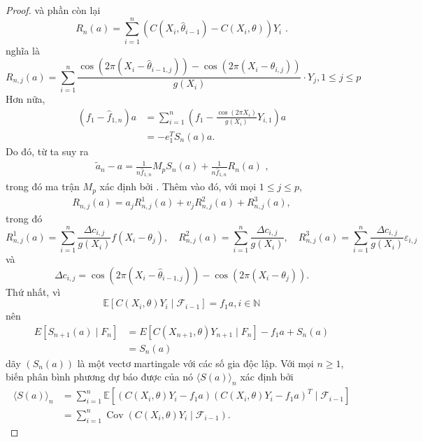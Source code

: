 \begin{proof}
và phần còn lại
$$
R_{n}(a)=\sum_{i=1}^{n}\left(C\left(X_{i}, \widehat{\theta}_{i-1}\right)-C\left(X_{i}, \theta\right)\right) Y_{i} \text{ .}
$$
nghĩa là 
$$
R_{n,j}(a) = \sum_{i=1}^n \frac{\cos \left(2 \pi\left(X_i-\hat{\theta}_{i-1,j}\right)\right)-\cos \left(2 \pi\left(X_i-\theta_{i, j}\right)\right)}{g\left(X_i\right)} \cdot Y_j, 1\leq j \leq p
$$
Hơn nữa,
$$
\begin{aligned}
\left(f_{1}-\widehat{f}_{1, n}\right) a & =\sum_{i=1}^{n}\left(f_{1}-\frac{\cos \left(2 \pi X_{i}\right)}{g\left(X_{i}\right)} Y_{i, 1}\right) a \\
& =-e_{1}^{T} S_{n}(a) a.
\end{aligned}
$$
Do đó, từ  ta suy ra
\begin{align}
    \widetilde{a}_{n}-a=\frac{1}{n \widehat{f}_{1, n}} M_{p} S_{n}(a)+\frac{1}{n \widehat{f}_{1, n}} R_{n}(a) \text{ ,}
    \label{8.15}
\end{align}
trong đó ma trận $M_{p}$ xác định bởi . Thêm vào đó, với mọi $1 \leq j \leq p$,
\begin{align}
    R_{n, j}(a)=a_{j} R_{n, j}^{1}(a)+v_{j} R_{n, j}^{2}(a)+R_{n, j}^{3}(a),
    \label{8.16}
\end{align}
trong đó
$$
R_{n, j}^{1}(a)=\sum_{i=1}^{n} \frac{\Delta c_{i, j}}{g\left(X_{i}\right)} f\left(X_{i}-\theta_{j}\right), \quad R_{n, j}^{2}(a)=\sum_{i=1}^{n} \frac{\Delta c_{i, j}}{g\left(X_{i}\right)}, \quad R_{n, j}^{3}(a)=\sum_{i=1}^{n} \frac{\Delta c_{i, j}}{g\left(X_{i}\right)} \varepsilon_{i, j}
$$
và
$$
\Delta c_{i, j}=\cos \left(2 \pi\left(X_{i}-\widehat{\theta}_{i-1, j}\right)\right)-\cos \left(2 \pi\left(X_{i}-\theta_{j}\right)\right).
$$
Thứ nhất, vì
$$
\mathbb{E}\left[C\left(X_{i}, \theta\right) Y_{i} \mid \mathcal{F}_{i-1}\right]=f_{1} a, i\in \mathbb{N}
$$
nên
\begin{align*}
E\left[S_{n+1}(a) \mid F_n\right]&=E\left[C\left(X_{n+1}, \theta\right) Y_{n+1} \mid F_n\right]-f_1 a+S_n(a) \\
& = S_n(a)
\end{align*}
dãy $\left(S_{n}(a)\right)$ là một vectơ martingale với các số gia độc lập. Với mọi $n \geq 1$, biến phân bình phương dự báo được của nó $\langle S(a)\rangle_{n}$ xác định bởi
$$
\begin{aligned}
\langle S(a)\rangle_{n} & =\sum_{i=1}^{n} \mathbb{E}\left[\left(C\left(X_{i}, \theta\right) Y_{i}-f_{1} a\right)\left(C\left(X_{i}, \theta\right) Y_{i}-f_{1} a\right)^{T} \mid \mathcal{F}_{i-1}\right] \\
& =\sum_{i=1}^{n} \operatorname{Cov}\left(C\left(X_{i}, \theta\right) Y_{i} \mid \mathcal{F}_{i-1}\right).

\end{aligned}$$
\end{proof}
